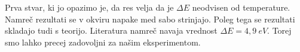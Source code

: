 \documentclass[10pt]{article}
\begin{document}
Prva stvar, ki jo opazimo je, da res velja da je $\Delta E$ neodvisen od temperature. Namreč rezultati se v okviru napake med sabo strinjajo. Poleg tega se rezultati skladajo tudi s teorijo. Literatura namreč navaja vrednost $\Delta E = 4,9\ eV$. Torej smo lahko precej zadovoljni za našim eksperimentom.
\end{document}
